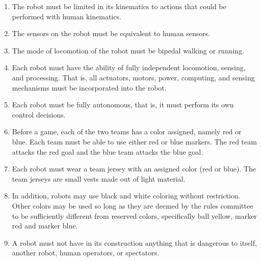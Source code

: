 \documentclass[12pt]{article}
\newcounter{law}[section]
\newenvironment{lawlist}[1][Law]{ %
  \begin{enumerate} %
    \renewcommand{\theenumi}{#1-\arabic{law}.\arabic{enumi}}} %
  {\end{enumerate}}
\begin{document}
\begin{lawlist}
  \begin{itemize}
    \item \emph{Small robots} are limited to a maximum height of 60cm
       and a maximum foot dimension of 13cm.
    \item \emph{Large robots} must have a height of more than 80cm and
    are limited to a maximum height of 150cm and a maximum foot
    dimension of 35cm.  
  \end{itemize}

\item \label{kinematics} The robot must be limited in its kinematics
to actions that could be performed with human kinematics.

\item \label{sensing} The sensors on the robot must be equivalent to
human sensors.

\item \label{walking} The mode of locomotion of the robot must be
bipedal walking or running. 

\item \label{autonomous} Each robot must have the ability of fully
  independent locomotion, sensing, and processing. That is, all
  actuators, motors, power, computing, and sensing mechanisms must be
  incorporated into the robot.

\item \label{autonomous2} Each robot must be fully autonomous, that
  is, it must perform its own control decisions.

\item Before a game, each of the two teams has a color assigned,
  namely red or blue. Each team must be able to use either red
  or blue markers. The red team attacks the red goal and the
  blue team attacks the blue goal. 

\item Each robot must wear a team jersey with an assigned color
(red or blue). The team jerseys are small vests made out of light
material.

\item In addition, robots may use black and white coloring without
  restriction. Other colors may be used so long as they are deemed by
  the rules committee to be sufficiently different from reserved
  colors, specifically ball yellow, marker red and
  marker blue.

\item A robot must not have in its construction anything that is
  dangerous to itself, another robot, human operators, or spectators.


\end{lawlist}
\end{document}
